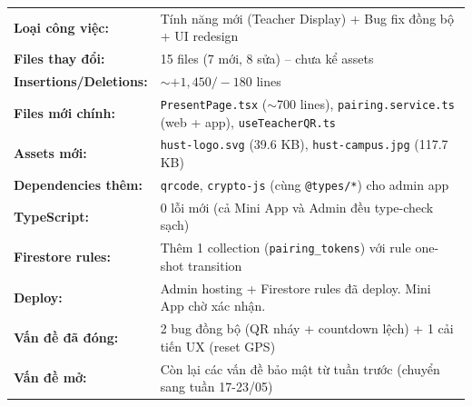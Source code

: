 \documentclass{article}
\begin{document}
\begin{tabularx}{\textwidth}{@{}l X@{}}
\textbf{Loại công việc:} & Tính năng mới (Teacher Display) + Bug fix đồng bộ + UI redesign \\
\textbf{Files thay đổi:} & 15 files (7 mới, 8 sửa) -- chưa kể assets \\
\textbf{Insertions/Deletions:} & ${\sim}+1{,}450 / -180$ lines \\
\textbf{Files mới chính:} & \texttt{PresentPage.tsx} ($\sim$700 lines), \texttt{pairing.service.ts} (web + app), \texttt{useTeacherQR.ts} \\
\textbf{Assets mới:} & \texttt{hust-logo.svg} (39.6 KB), \texttt{hust-campus.jpg} (117.7 KB) \\
\textbf{Dependencies thêm:} & \texttt{qrcode}, \texttt{crypto-js} (cùng \texttt{@types/*}) cho admin app \\
\textbf{TypeScript:} & 0 lỗi mới (cả Mini App và Admin đều type-check sạch) \\
\textbf{Firestore rules:} & Thêm 1 collection (\texttt{pairing\_tokens}) với rule one-shot transition \\
\textbf{Deploy:} & Admin hosting + Firestore rules đã deploy. Mini App chờ xác nhận. \\
\textbf{Vấn đề đã đóng:} & 2 bug đồng bộ (QR nháy + countdown lệch) + 1 cải tiến UX (reset GPS) \\
\textbf{Vấn đề mở:} & Còn lại các vấn đề bảo mật từ tuần trước (chuyển sang tuần 17-23/05) \\
\end{tabularx}
\end{document}
